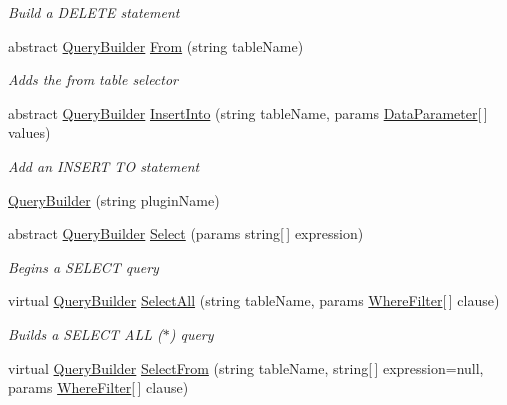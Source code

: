 \begin{DoxyCompactItemize}
\begin{DoxyCompactList}\small\item\em Build a D\+E\+L\+E\+T\+E statement \end{DoxyCompactList}\item 
abstract \hyperlink{classOTA_1_1Data_1_1QueryBuilder}{Query\+Builder} \hyperlink{classOTA_1_1Data_1_1QueryBuilder_a35880cc3d5aca31f138b2be11722e91f}{From} (string table\+Name)
\begin{DoxyCompactList}\small\item\em Adds the from table selector \end{DoxyCompactList}\item 
abstract \hyperlink{classOTA_1_1Data_1_1QueryBuilder}{Query\+Builder} \hyperlink{classOTA_1_1Data_1_1QueryBuilder_a9bde0ef6cc41bc9f5936a046f28cb61b}{Insert\+Into} (string table\+Name, params \hyperlink{structOTA_1_1Data_1_1DataParameter}{Data\+Parameter}\mbox{[}$\,$\mbox{]} values)
\begin{DoxyCompactList}\small\item\em Add an I\+N\+S\+E\+R\+T T\+O statement \end{DoxyCompactList}\item 
\hyperlink{classOTA_1_1Data_1_1QueryBuilder_a8ad66db426b1dba98a41b6fc94da3bf4}{Query\+Builder} (string plugin\+Name)
\item 
abstract \hyperlink{classOTA_1_1Data_1_1QueryBuilder}{Query\+Builder} \hyperlink{classOTA_1_1Data_1_1QueryBuilder_a6a8be3e241335be7fe29c514b8198796}{Select} (params string\mbox{[}$\,$\mbox{]} expression)
\begin{DoxyCompactList}\small\item\em Begins a S\+E\+L\+E\+C\+T query \end{DoxyCompactList}\item 
virtual \hyperlink{classOTA_1_1Data_1_1QueryBuilder}{Query\+Builder} \hyperlink{classOTA_1_1Data_1_1QueryBuilder_a801825ba2ef15b6581f8d2e7e367e7ee}{Select\+All} (string table\+Name, params \hyperlink{structOTA_1_1Data_1_1WhereFilter}{Where\+Filter}\mbox{[}$\,$\mbox{]} clause)
\begin{DoxyCompactList}\small\item\em Builds a S\+E\+L\+E\+C\+T A\+L\+L ($\ast$) query \end{DoxyCompactList}\item 
virtual \hyperlink{classOTA_1_1Data_1_1QueryBuilder}{Query\+Builder} \hyperlink{classOTA_1_1Data_1_1QueryBuilder_a8dd0065482b15d76c23f878ed8723492}{Select\+From} (string table\+Name, string\mbox{[}$\,$\mbox{]} expression=null, params \hyperlink{structOTA_1_1Data_1_1WhereFilter}{Where\+Filter}\mbox{[}$\,$\mbox{]} clause)

\end{DoxyCompactItemize}
